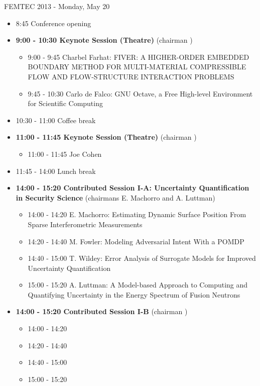 \documentclass[10pt, A4]{article}%
\begin{document}
\centerline{\huge FEMTEC 2013 - Monday, May 20}
\vspace{4mm}

\begin{itemize}    
  \item 8:45 Conference opening
  \item {\bf 9:00 - 10:30 Keynote Session (Theatre)} (chairman ) 
  \begin{itemize}
    \item 9:00 - 9:45 {Charbel Farhat}: {FIVER: A HIGHER-ORDER EMBEDDED BOUNDARY METHOD FOR MULTI-MATERIAL COMPRESSIBLE FLOW AND FLOW-STRUCTURE INTERACTION PROBLEMS}
    \item 9:45 - 10:30 {Carlo de Falco}: {GNU Octave, a Free High-level Environment for Scientific Computing}
  \end{itemize}
  \item 10:30 - 11:00 Coffee break
  \item {\bf 11:00 - 11:45 Keynote Session (Theatre)} (chairman ) 
  \begin{itemize}
    \item 11:00 - 11:45 {Joe Cohen}
  \end{itemize}
  \item 11:45 - 14:00 Lunch break      
  \item {\bf 14:00 - 15:20 Contributed Session I-A: Uncertainty Quantification in Security Science} (chairmans E. Machorro and A. Luttman) 
  \begin{itemize}
    \item 14:00 - 14:20 {E. Machorro}: {Estimating Dynamic Surface Position From Sparse Interferometric Measurements}
    \item 14:20 - 14:40 {M. Fowler}: {Modeling Adversarial Intent With a POMDP}
    \item 14:40 - 15:00 {T. Wildey}: {Error Analysis of Surrogate Models for Improved Uncertainty Quantification}
    \item 15:00 - 15:20 {A. Luttman}: {A Model-based Approach to Computing and Quantifying Uncertainty in the Energy Spectrum of Fusion Neutrons}
  \end{itemize}
  \item {\bf 14:00 - 15:20 Contributed Session I-B} (chairman ) 
  \begin{itemize}
    \item 14:00 - 14:20 
    \item 14:20 - 14:40 
    \item 14:40 - 15:00 
    \item 15:00 - 15:20 

\end{itemize}
\end{itemize}
\end{document}
